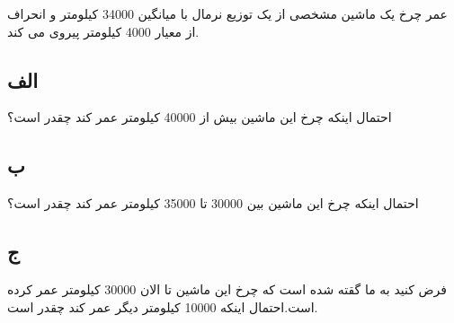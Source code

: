 
عمر چرخ یک ماشین مشخصی از یک توزیع نرمال با میانگین 34000 کیلومتر و انحراف از معیار 4000 کیلومتر پیروی می کند.

\subsection*{الف}
احتمال اینکه چرخ این ماشین بیش از 40000 کیلومتر عمر کند چقدر است؟
\subsection*{ب}
احتمال اینکه چرخ این ماشین بین 30000 تا 35000 کیلومتر عمر کند چقدر است؟
\subsection*{ج}
فرض کنید به ما گقته شده است که چرخ این ماشین تا الان 30000 کیلومتر عمر کرده است.احتمال اینکه 10000 کیلومتر دیگر عمر کند چقدر است.

